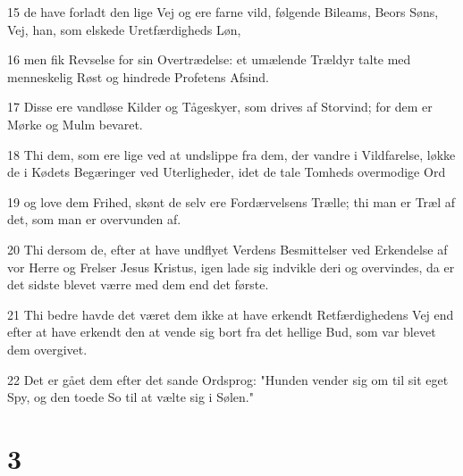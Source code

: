 \par 15 de have forladt den lige Vej og ere farne vild, følgende Bileams, Beors Søns, Vej, han, som elskede Uretfærdigheds Løn,
\par 16 men fik Revselse for sin Overtrædelse: et umælende Trældyr talte med menneskelig Røst og hindrede Profetens Afsind.
\par 17 Disse ere vandløse Kilder og Tågeskyer, som drives af Storvind; for dem er Mørke og Mulm bevaret.
\par 18 Thi dem, som ere lige ved at undslippe fra dem, der vandre i Vildfarelse, løkke de i Kødets Begæringer ved Uterligheder, idet de tale Tomheds overmodige Ord
\par 19 og love dem Frihed, skønt de selv ere Fordærvelsens Trælle; thi man er Træl af det, som man er overvunden af.
\par 20 Thi dersom de, efter at have undflyet Verdens Besmittelser ved Erkendelse af vor Herre og Frelser Jesus Kristus, igen lade sig indvikle deri og overvindes, da er det sidste blevet værre med dem end det første.
\par 21 Thi bedre havde det været dem ikke at have erkendt Retfærdighedens Vej end efter at have erkendt den at vende sig bort fra det hellige Bud, som var blevet dem overgivet.
\par 22 Det er gået dem efter det sande Ordsprog: "Hunden vender sig om til sit eget Spy, og den toede So til at vælte sig i Sølen."

\chapter{3}

